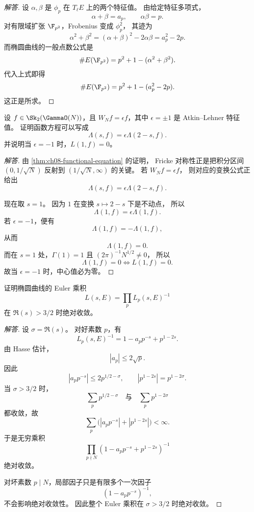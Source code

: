 \begin{proof}[解答]
设 $\alpha,\beta$ 是 $\phi_p$ 在 $T_\ell E$ 上的两个特征值。
由给定特征多项式，
\[
  \alpha+\beta=a_p,
  \qquad \alpha\beta=p.
\]
对有限域扩张 $\F_{p^2}$，Frobenius 变成 $\phi_p^2$，
其迹为
\[
  \alpha^2+\beta^2=(\alpha+\beta)^2-2\alpha\beta=a_p^2-2p.
\]
而椭圆曲线的一般点数公式是
\[
  \#E(\F_{p^2})=p^2+1-(\alpha^2+\beta^2).
\]
代入上式即得
\[
  \#E(\F_{p^2})=p^2+1-(a_p^2-2p).
\]
这正是所求。
\end{proof}

\begin{exercise}
\label{ex:ch08-functional-symmetry}
设 $f\in \Sk_2(\GammaO(N))$，且 $W_Nf=\epsilon f$，其中 $\epsilon=\pm1$ 是 Atkin--Lehner 特征值。
证明函数方程可以写成
\[
  \Lambda(s,f)=\epsilon\Lambda(2-s,f).
\]
并说明当 $\epsilon=-1$ 时，$L(1,f)=0$。
\end{exercise}

\begin{proof}[解答]
由 \cref{thm:ch08-functional-equation} 的证明，
Fricke 对称性正是把积分区间 $(0,1/\sqrt N)$ 反射到 $(1/\sqrt N,\infty)$ 的关键。
若 $W_Nf=\epsilon f$，
则对应的变换公式正给出
\[
  \Lambda(s,f)=\epsilon\Lambda(2-s,f).
\]

现在取 $s=1$。
因为 $1$ 在变换 $s\mapsto 2-s$ 下是不动点，
所以
\[
  \Lambda(1,f)=\epsilon\Lambda(1,f).
\]
若 $\epsilon=-1$，便有
\[
  \Lambda(1,f)=-\Lambda(1,f),
\]
从而
\[
  \Lambda(1,f)=0.
\]
而在 $s=1$ 处，$\Gamma(1)=1$ 且 $(2\pi)^{-1}N^{1/2}\neq0$，
所以
\[
  \Lambda(1,f)=0 \iff L(1,f)=0.
\]
故当 $\epsilon=-1$ 时，中心值必为零。
\end{proof}

\begin{exercise}
\label{ex:ch08-euler-convergence}
证明椭圆曲线的 Euler 乘积
\[
  L(s,E)=\prod_p L_p(s,E)^{-1}
\]
在 $\Re(s)>3/2$ 时绝对收敛。
\end{exercise}

\begin{proof}[解答]
设 $\sigma=\Re(s)$。
对好素数 $p$，有
\[
  L_p(s,E)^{-1}=1-a_pp^{-s}+p^{1-2s}.
\]
由 Hasse 估计，
\[
  |a_p|\le 2\sqrt p.
\]
因此
\[
  |a_pp^{-s}|\le 2p^{1/2-\sigma},
  \qquad
  |p^{1-2s}|=p^{1-2\sigma}.
\]
当 $\sigma>3/2$ 时，
\[
  \sum_p p^{1/2-\sigma}
  \quad\text{与}\quad
  \sum_p p^{1-2\sigma}
\]
都收敛，故
\[
  \sum_p\bigl(|a_pp^{-s}|+|p^{1-2s}|\bigr)<\infty.
\]
于是无穷乘积
\[
  \prod_{p\nmid N}(1-a_pp^{-s}+p^{1-2s})^{-1}
\]
绝对收敛。

对坏素数 $p\mid N$，局部因子只是有限多个一次因子
\[
  (1-a_pp^{-s})^{-1},
\]
不会影响绝对收敛性。
因此整个 Euler 乘积在 $\sigma>3/2$ 时绝对收敛。
\end{proof}

